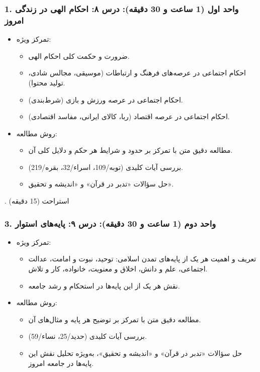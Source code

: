 \documentclass{article}
\begin{document}
\subsubsection*{1. واحد اول (1 ساعت و 30 دقیقه): درس ۸: احکام الهی در زندگی امروز}
\begin{itemize}
    \item تمرکز ویژه:
    \begin{itemize}
        \item ضرورت و حکمت کلی احکام الهی.
        \item احکام اجتماعی در عرصه‌های فرهنگ و ارتباطات (موسیقی، مجالس شادی، تولید محتوا).
        \item احکام اجتماعی در عرصه ورزش و بازی (شرط‌بندی).
        \item احکام اجتماعی در عرصه اقتصاد (ربا، کالای ایرانی، مفاسد اقتصادی).
    \end{itemize}
    \item روش مطالعه:
    \begin{itemize}
        \item مطالعه دقیق متن با تمرکز بر حدود و شرایط هر حکم و دلایل کلی آن.
        \item بررسی آیات کلیدی (توبه/109، اسراء/32، بقره/219).
        \item حل سؤالات «تدبر در قرآن» و «اندیشه و تحقیق».
    \end{itemize}
\end{itemize}

\vspace{\baselineskip}
. استراحت (15 دقیقه)
\vspace{\baselineskip}

\subsubsection*{3. واحد دوم (1 ساعت و 30 دقیقه): درس ۹: پایه‌های استوار}
\begin{itemize}
    \item تمرکز ویژه:
    \begin{itemize}
        \item تعریف و اهمیت هر یک از پایه‌های تمدن اسلامی: توحید، نبوت و امامت، عدالت اجتماعی، علم و دانش، اخلاق و معنویت، خانواده، کار و تلاش.
        \item نقش هر یک از این پایه‌ها در استحکام و رشد جامعه.
    \end{itemize}
    \item روش مطالعه:
    \begin{itemize}
        \item مطالعه دقیق متن با تمرکز بر توضیح هر پایه و مثال‌های آن.
        \item بررسی آیات کلیدی (حدید/25، نساء/59).
        \item حل سؤالات «تدبر در قرآن» و «اندیشه و تحقیق»، به‌ویژه تحلیل نقش این پایه‌ها در جامعه امروز.
    \end{itemize}
\end{itemize}
\end{document}
